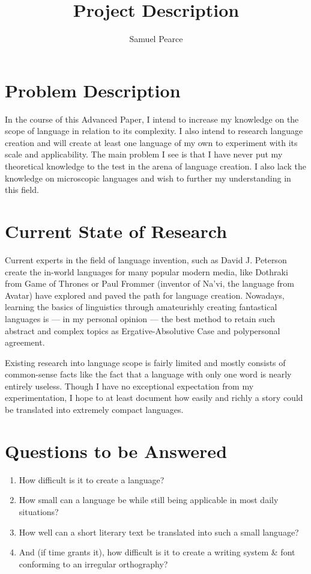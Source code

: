 \documentclass[a4paper,10pt]{article}
\title{Project Description}
\author{Samuel Pearce}
\begin{document}
\maketitle

\tableofcontents

\pagebreak

\section{Problem Description}
In the course of this Advanced Paper, I intend to increase my knowledge on the scope of
language in relation to its complexity. I also intend to research language creation and
will create at least one language of my own to experiment with its scale and applicability.
The main problem I see is that I have never put my theoretical knowledge to the test in
the arena of language creation. I also lack the knowledge on microscopic languages and
wish to further my understanding in this field.

\section{Current State of Research}
Current experts in the field of language invention, such as David J. Peterson create
the in-world languages for many popular modern media, like Dothraki from Game of Thrones
or Paul Frommer (inventor of Na'vi, the language from Avatar) have explored and paved the
path for language creation. Nowadays, learning the basics of linguistics through amateurishly
creating fantastical languages is --- in my personal opinion --- the best method to retain
such abstract and complex topics as Ergative-Absolutive Case and polypersonal agreement.

Existing research into language scope is fairly limited and mostly consists of common-sense
facts like the fact that a language with only one word is nearly entirely useless. Though
I have no exceptional expectation from my experimentation, I hope to at least document how
easily and richly a story could be translated into extremely compact languages.

\section{Questions to be Answered}
\begin{enumerate}
    \item How difficult is it to create a language?
    \item How small can a language be while still being applicable in most daily situations?
    \item How well can a short literary text be translated into such a small language?
    \item And (if time grants it), how difficult is it to create a writing system \& font
          conforming to an irregular orthography?
\end{enumerate}
\end{document}
